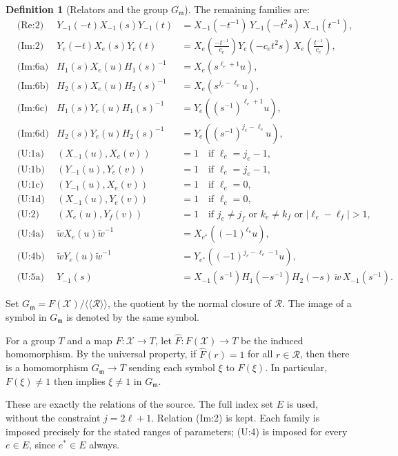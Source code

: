 \documentclass[11pt]{article}
\theoremstyle{definition}
\newtheorem{definition}[theorem]{Definition}
\theoremstyle{remark}
\newcommand{\wt}{\widetilde{w}}
\begin{document}
\begin{definition}[Relators and the group $G_{\mathfrak m}$]
The remaining families are:
\begin{align*}
&\text{(Re:2)} & Y_{-1}(-t)X_{-1}(s)Y_{-1}(t)&=X_{-1}(-t^{-1})\,Y_{-1}(-t^2s)\,X_{-1}(t^{-1}),\\
&\text{(Im:2)} & Y_e(-t)X_e(s)Y_e(t)&=X_e\!\left(\tfrac{-t^{-1}}{c_e}\right)Y_e(-c_et^2s)\,X_e\!\left(\tfrac{t^{-1}}{c_e}\right),\\
&\text{(Im:6a)} & H_1(s)X_e(u)H_1(s)^{-1}&=X_e(s^{\ell_e+1}u),\\
&\text{(Im:6b)} & H_2(s)X_e(u)H_2(s)^{-1}&=X_e(s^{j_e-\ell_e}u),\\
&\text{(Im:6c)} & H_1(s)Y_e(u)H_1(s)^{-1}&=Y_e((s^{-1})^{\ell_e+1}u),\\
&\text{(Im:6d)} & H_2(s)Y_e(u)H_2(s)^{-1}&=Y_e((s^{-1})^{j_e-\ell_e}u),\\
&\text{(U:1a)} & (X_{-1}(u),X_e(v))&=1\quad\text{if } \ell_e=j_e-1,\\
&\text{(U:1b)} & (Y_{-1}(u),Y_e(v))&=1\quad\text{if } \ell_e=j_e-1,\\
&\text{(U:1c)} & (Y_{-1}(u),X_e(v))&=1\quad\text{if } \ell_e=0,\\
&\text{(U:1d)} & (X_{-1}(u),Y_e(v))&=1\quad\text{if } \ell_e=0,\\
&\text{(U:2)} & (X_e(u),Y_f(v))&=1\quad\text{if } j_e\neq j_f \text{ or } k_e\ne k_f \text{ or } |\ell_e-\ell_f|>1,\\
&\text{(U:4a)} & \wt X_e(u)\wt^{-1}&=X_{e^\ast}((-1)^{\ell_e}u),\\
&\text{(U:4b)} & \wt Y_e(u)\wt^{-1}&=Y_{e^\ast}((-1)^{j_e-\ell_e-1}u),\\
&\text{(U:5a)} & Y_{-1}(s)&=X_{-1}(s^{-1})H_1(-s^{-1})H_2(-s)\,\wt\,X_{-1}(s^{-1}).
\end{align*}

Set $G_{\mathfrak m}=F(\mathcal X)/\langle\!\langle\mathcal R\rangle\!\rangle$, the quotient by the normal closure of $\mathcal R$. The image of a symbol in $G_{\mathfrak m}$ is denoted by the same symbol.

For a group $T$ and a map $F\colon\mathcal X\to T$, let $\widehat F\colon F(\mathcal X)\to T$ be the induced homomorphism. By the universal property, if $\widehat F(r)=1$ for all $r\in\mathcal R$, then there is a homomorphism $G_{\mathfrak m}\to T$ sending each symbol $\xi$ to $F(\xi)$. In particular, $F(\xi)\ne 1$ then implies $\xi\neq1$ in $G_{\mathfrak m}$.
\end{definition}

These are exactly the relations of the source. The full index set $E$ is used, without the constraint $j=2\ell+1$. Relation (Im:2) is kept. Each family is imposed precisely for the stated ranges of parameters; (U:4) is imposed for every $e\in E$, since $e^\ast\in E$ always.
\end{document}
